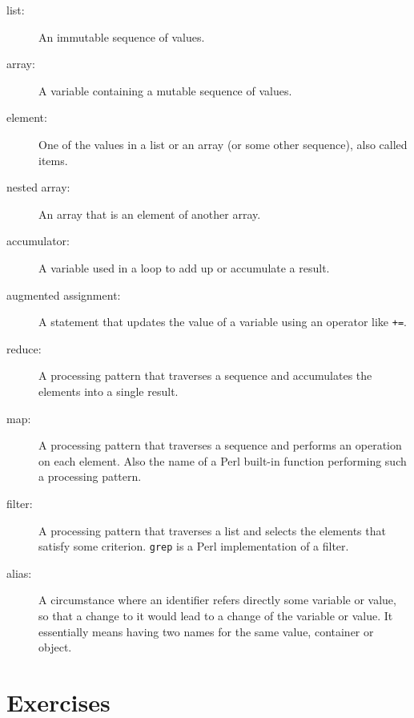 \begin{description}

\item[list:] An immutable sequence of values.

\item[array:] A variable containing a mutable sequence 
of values.

\item[element:] One of the values in a list or an 
array (or some other sequence), also called items.

\item[nested array:] An array that is an element of another array.

\item[accumulator:] A variable used in a loop to add up or
accumulate a result.

\item[augmented assignment:] A statement that updates the value
of a variable using an operator like \verb"+=".

\item[reduce:] A processing pattern that traverses a sequence 
and accumulates the elements into a single result.

\item[map:] A processing pattern that traverses a 
sequence and performs an operation on each element. 
Also the name of a Perl built-in function performing 
such a processing pattern.

\item[filter:] A processing pattern that traverses a 
list and selects the elements that satisfy some criterion. 
{\tt grep} is a Perl implementation of a filter.

\item[alias:] A circumstance where an identifier refers 
directly some variable or value, so that 
a change to it would lead to a change of 
the variable or value. It essentially means having 
two names for the same value, container or object.

\end{description}


\section{Exercises}
\label{array_exercises}

